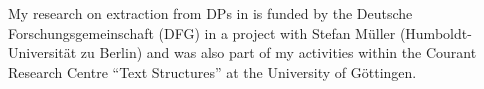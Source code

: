 \documentclass[output=paper]{langsci/langscibook}
\begin{document}
My research on extraction from DPs in  is funded by the Deutsche Forschungsgemeinschaft (DFG) in a project with Stefan Müller (Hum\-boldt-Uni\-ver\-si\-tät zu Berlin) and was also part of my activities within the Courant Research Centre “Text Structures” at the University of Göttingen.
% 
% 
% 
% 
% 
% 
% 
% 
% 
% 
% 
% 
% 
% 
% 
\end{document}
